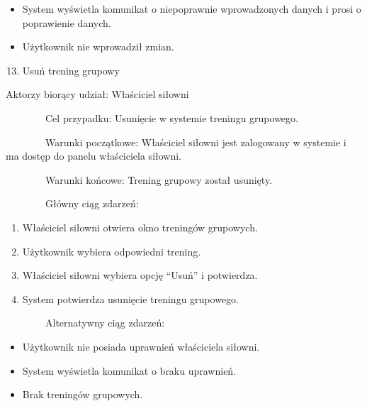 \documentclass[
]{article}
\providecommand{\tightlist}{%
  \setlength{\itemsep}{0pt}\setlength{\parskip}{0pt}}
\begin{document}
\begin{itemize}
\tightlist
\item
  {System wyświetla komunikat o niepoprawnie wprowadzonych danych i
  prosi o poprawienie danych.}
\end{itemize}

\begin{itemize}
\tightlist
\item
  {Użytkownik nie wprowadził zmian.}
\end{itemize}

{\hfill\break
}

\begin{enumerate}
\setcounter{enumi}{12}
\tightlist
\item
  {Usuń trening grupowy}
\end{enumerate}

{Aktorzy biorący udział: Właściciel siłowni}

{~~~~~~~~Cel przypadku: Usunięcie w systemie treningu grupowego.}

{~~~~~~~~Warunki początkowe: Właściciel siłowni jest zalogowany w
systemie i ma dostęp do panelu właściciela siłowni.}

{~~~~~~~~Warunki końcowe: Trening grupowy został usunięty.}

{~~~~~~~~Główny ciąg zdarzeń:}

\begin{enumerate}
\tightlist
\item
  {Właściciel siłowni otwiera okno treningów grupowych.}
\item
  {Użytkownik wybiera odpowiedni trening.}
\item
  {Właściciel siłowni wybiera opcję ``Usuń'' i potwierdza.}
\item
  {System potwierdza usunięcie treningu grupowego.}
\end{enumerate}

{~~~~~~~~Alternatywny ciąg zdarzeń:}

\begin{itemize}
\tightlist
\item
  {Użytkownik nie posiada uprawnień właściciela siłowni.}
\end{itemize}

\begin{itemize}
\tightlist
\item
  {System wyświetla komunikat o braku uprawnień.}
\end{itemize}

\begin{itemize}
\tightlist
\item
  {Brak treningów grupowych.}
\end{itemize}
\end{document}
